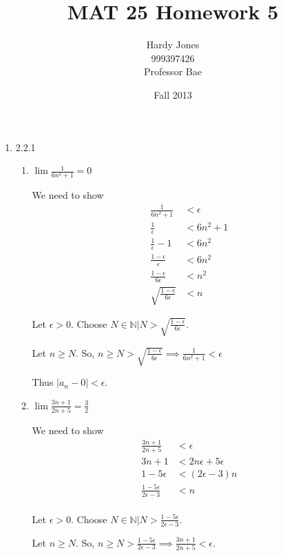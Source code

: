 \documentclass[12pt,letterpaper]{article}
\title{MAT 25 Homework 5\vspace{-2ex}}
\author{Hardy Jones\\
        999397426\\
        Professor Bae\vspace{-2ex}}
\date{Fall 2013}
\begin{document}
  \maketitle

  \begin{enumerate}
    \item 2.2.1
      \begin{enumerate}
        \item
          $\lim \frac{1}{6n^2 + 1} = 0$

          We need to show
          \begin{align*}
            \frac{1}{6n^2 + 1} &< \epsilon \\
            \frac{1}{\epsilon} &< 6n^2 + 1 \\
            \frac{1}{\epsilon} - 1 &< 6n^2 \\
            \frac{1 - \epsilon}{\epsilon} &< 6n^2 \\
            \frac{1 - \epsilon}{6\epsilon} &< n^2 \\
            \sqrt{\frac{1 - \epsilon}{6\epsilon}} &< n
          \end{align*}

          Let $\epsilon > 0$.
          Choose $N \in \mathbb{N} | N > \sqrt{\frac{1 - \epsilon}{6\epsilon}}$.

          Let $n \ge N$.
          So, $n \ge N > \sqrt{\frac{1 - \epsilon}{6\epsilon}} \implies \frac{1}{6n^2 + 1} < \epsilon$

          Thus $|a_n - 0| < \epsilon$.

        \item
          $\lim \frac{3n + 1}{2n + 5} = \frac{3}{2}$

          We need to show
          \begin{align*}
            \frac{3n + 1}{2n + 5} &< \epsilon \\
            3n + 1 &< 2n\epsilon + 5\epsilon \\
            1 - 5\epsilon &< (2\epsilon - 3)n \\
            \frac{1 - 5\epsilon}{2\epsilon - 3} &< n \\
          \end{align*}

          Let $\epsilon > 0$.
          Choose $N \in \mathbb{N} | N > \frac{1 - 5\epsilon}{2\epsilon - 3}$.

          Let $n \ge N$.
          So, $n \ge N > \frac{1 - 5\epsilon}{2\epsilon - 3} \implies \frac{3n + 1}{2n + 5} < \epsilon$.


\end{enumerate}
\end{enumerate}
\end{document}
